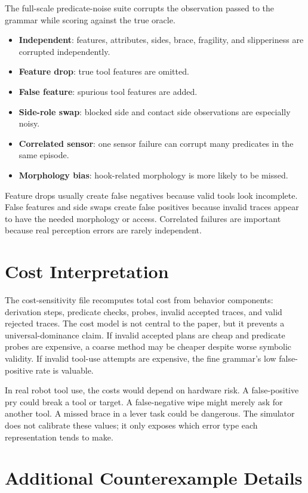 \documentclass{article}
\begin{document}
The full-scale predicate-noise suite corrupts the observation passed to the grammar while scoring against the true oracle.
\begin{itemize}
    \item \textbf{Independent}: features, attributes, sides, brace, fragility, and slipperiness are corrupted independently.
    \item \textbf{Feature drop}: true tool features are omitted.
    \item \textbf{False feature}: spurious tool features are added.
    \item \textbf{Side-role swap}: blocked side and contact side observations are especially noisy.
    \item \textbf{Correlated sensor}: one sensor failure can corrupt many predicates in the same episode.
    \item \textbf{Morphology bias}: hook-related morphology is more likely to be missed.
\end{itemize}

Feature drops usually create false negatives because valid tools look incomplete. False features and side swaps create false positives because invalid traces appear to have the needed morphology or access. Correlated failures are important because real perception errors are rarely independent.

\section{Cost Interpretation}

The cost-sensitivity file recomputes total cost from behavior components: derivation steps, predicate checks, probes, invalid accepted traces, and valid rejected traces. The cost model is not central to the paper, but it prevents a universal-dominance claim. If invalid accepted plans are cheap and predicate probes are expensive, a coarse method may be cheaper despite worse symbolic validity. If invalid tool-use attempts are expensive, the fine grammar's low false-positive rate is valuable.

In real robot tool use, the costs would depend on hardware risk. A false-positive pry could break a tool or target. A false-negative wipe might merely ask for another tool. A missed brace in a lever task could be dangerous. The simulator does not calibrate these values; it only exposes which error type each representation tends to make.

\section{Additional Counterexample Details}
\end{document}
